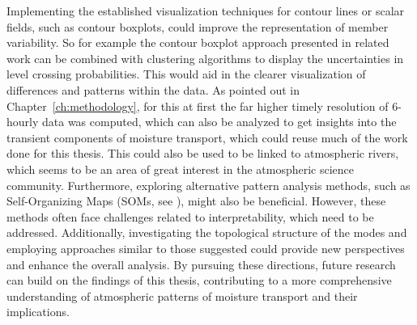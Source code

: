 Implementing the established visualization techniques for contour lines or scalar fields, such as contour boxplots, could improve the representation of member variability.
So for example the contour boxplot approach presented in related work can be combined with clustering algorithms to display the uncertainties in level crossing probabilities. 
This would aid in the clearer visualization of differences and patterns within the data.
As pointed out in Chapter~\ref{ch:methodology}, for this at first the far higher timely resolution of 6-hourly data was computed, which can also be analyzed to get insights into the transient components of moisture transport, which could reuse much of the work done for this thesis.
This could also be used to be linked to atmospheric rivers, which seems to be an area of great interest in the atmospheric science community.
Furthermore, exploring alternative pattern analysis methods, such as Self-Organizing Maps (SOMs, see ), might also be beneficial. 
However, these methods often face challenges related to interpretability, which need to be addressed.
Additionally, investigating the topological structure of the modes and employing approaches similar to those suggested  could provide new perspectives and enhance the overall analysis.
By pursuing these directions, future research can build on the findings of this thesis, contributing to a more comprehensive understanding of atmospheric patterns of moisture transport and their implications.



